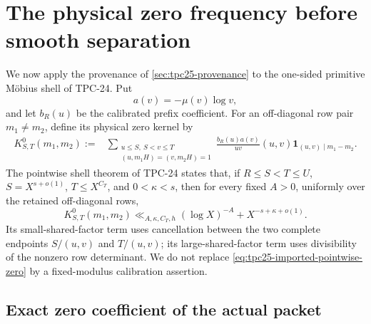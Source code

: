\section{The physical zero frequency before smooth separation}
\label{sec:tpc25-zero-first}

We now apply the provenance of \cref{sec:tpc25-provenance} to the
one-sided primitive M\"obius shell of TPC-24.  Put
\begin{equation}
 a(v)=-\mu(v)\log v,
 \label{eq:tpc25-a-coefficient}
\end{equation}
and let \(b_R(u)\) be the calibrated prefix coefficient.  For an
off-diagonal row pair \(m_1\ne m_2\), define its physical zero kernel
by
\begin{align}
 K^0_{S,T}(m_1,m_2)
 :={}&
 \sum_{\substack{u\le S,\ S<v\le T\\
                  (u,m_1H)=(v,m_2H)=1}}
 \frac{b_R(u)a(v)}{uv}(u,v)
 \mathbf 1_{(u,v)\mid m_1-m_2}.
 \label{eq:tpc25-zero-kernel}
\end{align}
The pointwise shell theorem of TPC-24 states that, if
\(R\le S<T\le U\), \(S=X^{s+o(1)}\), \(T\le X^{C_T}\), and
\(0<\kappa<s\), then for
every fixed \(A>0\), uniformly over the retained off-diagonal rows,
\begin{equation}
 K^0_{S,T}(m_1,m_2)
 \ll_{A,\kappa,C_T,h}
 (\log X)^{-A}+X^{-s+\kappa+o(1)}.
 \label{eq:tpc25-imported-pointwise-zero}
\end{equation}
Its small-shared-factor term uses cancellation between the two complete
endpoints \(S/(u,v)\) and \(T/(u,v)\); its large-shared-factor term
uses divisibility of the nonzero row determinant.  We do not replace
\eqref{eq:tpc25-imported-pointwise-zero} by a fixed-modulus
calibration assertion.

\subsection{Exact zero coefficient of the actual packet}

